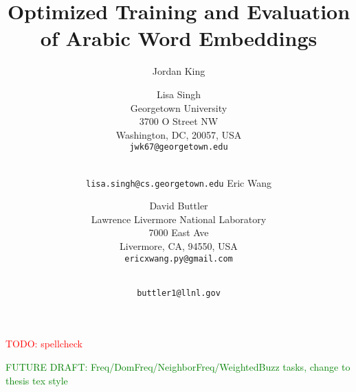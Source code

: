 \documentclass[11pt]{article}
\title{Optimized Training and Evaluation of Arabic Word Embeddings}
\author{Jordan King \and Lisa Singh\\
	    Georgetown University\\
	    3700 O Street NW\\
	    Washington, DC, 20057, USA\\
	    {\tt jwk67@georgetown.edu} \and\\
	    {\tt lisa.singh@cs.georgetown.edu}
	  \And
		Eric Wang \and David Buttler\\
	    Lawrence Livermore National Laboratory\\
	    7000 East Ave\\
	    Livermore, CA, 94550, USA\\
	    {\tt ericxwang.py@gmail.com} \and\\
	    {\tt buttler1@llnl.gov}
	    }
\date{}
\begin{document}
\maketitle

\textcolor{red}{TODO: spellcheck}

\textcolor{green}{FUTURE DRAFT: Freq/DomFreq/NeighborFreq/WeightedBuzz tasks, change to thesis tex style}













% 


\end{document}
